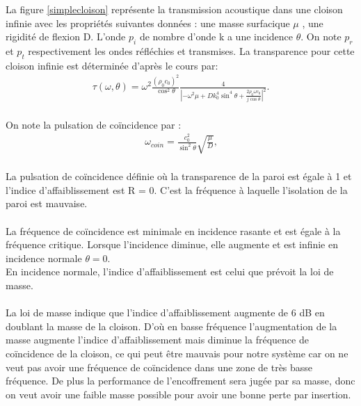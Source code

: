\documentclass[12pt,foolscap]{report}
\begin{document}
	La figure \ref{simplecloison} représente la transmission acoustique dans une cloison infinie avec les propriétés suivantes données : une masse surfacique \(\mu \) , une rigidité de flexion D. L'onde \({p_i}\) de nombre d'onde k a une incidence \(\theta \). On note \({p_r}\) et \({p_t}\) respectivement les ondes réfléchies et transmises.
	La transparence pour cette cloison infinie est déterminée d'après le cours \cite{cours} par: \\
	\begin{align}
	\tau (\omega ,\theta ) = {\omega ^2}\frac{{{{({\rho _0}{c_0})}^2}}}{{{{\cos }^2}\theta }}\frac{4}{{{{\left| { - {\omega ^2}\mu  + Dk_0^4{{\sin }^4}\theta  + \frac{{2{\rho _0}\omega {c_0}}}{{j\cos \theta }}} \right|}^2}}}\text{.}
	\end{align} \\
	On note la pulsation de coïncidence par :\\
	\begin{align}
	{\omega _{coin}} = \frac{{c_0^2}}{{{{\sin }^2}\theta }}\sqrt {\frac{\mu }{D}} \text{,}
	\end{align} \\

	
	
	
	La pulsation de coïncidence définie où la transparence de la paroi est égale à 1 et l'indice d'affaiblissement est R = 0. C'est la fréquence à laquelle l'isolation de la paroi est mauvaise.\\ \\
	
	La fréquence de coïncidence est minimale en incidence rasante et est égale à la fréquence critique. Lorsque l'incidence diminue, elle augmente et est infinie en incidence normale \(\theta  = 0\). \\
	En incidence normale, l'indice d'affaiblissement est celui que prévoit la loi de masse.\\ \\
	La loi de masse indique que l'indice d'affaiblissement augmente de 6 dB en doublant la masse de la cloison. D'où en basse fréquence l'augmentation de la masse augmente l'indice d'affaiblissement mais diminue la fréquence de coïncidence de la cloison, ce qui peut être mauvais pour notre système car on ne veut pas avoir une fréquence de coïncidence dans une zone de très basse fréquence. De plus la performance de l'encoffrement sera jugée par sa masse, donc on veut avoir une faible masse possible pour avoir une bonne perte par insertion. \\ 
		
\end{document}
